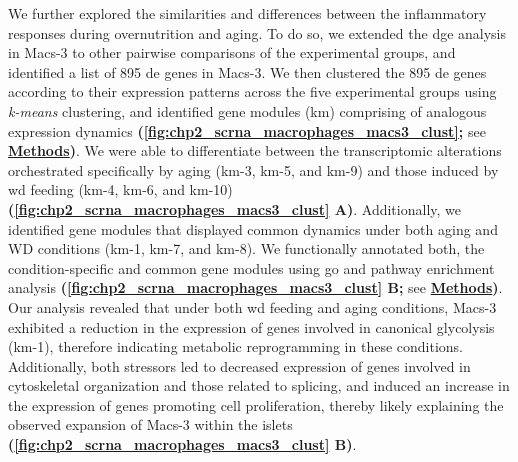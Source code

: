 \par We further explored the similarities and differences between the inflammatory responses during overnutrition and aging. To do so, we extended the \gls{dge} analysis in Macs-3 to other pairwise comparisons of the experimental groups, and identified a list of 895 \gls{de} genes in Macs-3. We then clustered the 895 \gls{de} genes according to their expression patterns across the five experimental groups using \textit{k-means} clustering, and identified gene modules (km) comprising of analogous expression dynamics \textbf{(\autoref{fig:chp2_scrna_macrophages_macs3_clust};} see \hyperref[subsubsec:met_chp2_dge]{\textbf{Methods}}\textbf{)}. We were able to differentiate between the transcriptomic alterations orchestrated specifically by aging (km-3, km-5, and km-9) and those induced by \gls{wd} feeding (km-4, km-6, and km-10) \textbf{(\autoref{fig:chp2_scrna_macrophages_macs3_clust} A)}. Additionally, we identified gene modules that displayed common dynamics under both aging and WD conditions (km-1, km-7, and km-8). We functionally annotated both, the condition-specific and common gene modules using \gls{go} and pathway enrichment analysis \textbf{(\autoref{fig:chp2_scrna_macrophages_macs3_clust} B;} see \hyperref[subsubsec:met_chp2_gogsea]{\textbf{Methods}}\textbf{)}. Our analysis revealed that under both \gls{wd} feeding and aging conditions, Macs-3 exhibited a reduction in the expression of genes involved in canonical glycolysis (km-1), therefore indicating metabolic reprogramming in these conditions. Additionally, both stressors led to decreased expression of genes involved in cytoskeletal organization and those related to  splicing, and induced an increase in the expression of genes promoting cell proliferation, thereby likely explaining the observed expansion of Macs-3 within the islets \textbf{(\autoref{fig:chp2_scrna_macrophages_macs3_clust} B)}.\\


